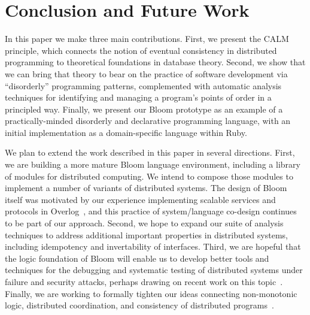 \section{Conclusion and Future Work}
\label{sec:conclusion}
In this paper we make three main contributions.  First, we present the CALM
principle, which connects the notion of eventual consistency in
distributed programming to theoretical foundations in database theory.
Second, we show that we can bring that theory to bear on the practice of
software development via ``disorderly'' programming patterns, complemented with automatic
analysis techniques for identifying and managing a program's points of order in a principled way. Finally,
we present our Bloom prototype as an example of a practically-minded disorderly and declarative
programming language, with an initial implementation as a domain-specific
language within Ruby.

We plan to extend the work described in this paper in several directions. First,
we are building a more mature Bloom language environment, including a library of modules for distributed computing.  We intend to compose 
those modules to implement a number of variants of distributed systems. The design of Bloom 
itself was motivated by our experience implementing scalable services and protocols in Overlog~\cite{boom-eurosys,netdb}, and this practice of system/language co-design continues to be part of our approach.  Second, we hope to expand
our suite of analysis techniques to address additional important properties in distributed systems, including idempotency and invertability of interfaces. Third, we are hopeful that the logic foundation of Bloom will enable us to develop better
tools and techniques for the debugging and systematic testing of distributed
systems under failure and security attacks, perhaps drawing on recent work on this topic~\cite{fate-destini,secureblox}.
Finally, we are working to formally tighten our ideas connecting non-monotonic logic, distributed coordination, and consistency of distributed programs~\cite{podskey-sigrec}.
